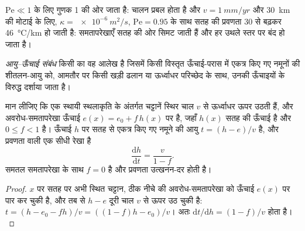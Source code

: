 $\mathrm{Pe} \ll 1$ के लिए गुणक 1 की ओर जाता है: चालन प्रबल होता है और
$v = \qty{1}{mm/yr}$ और \qty{30}{km} की मोटाई के लिए,
$\kappa = \qty{e-6}{m^2/s}$, $\mathrm{Pe} = 0.95$ के साथ सतह की प्रवणता
30 से बढ़कर \qty{46}{\celsius/km} हो जाती है: समतापरेखाएँ सतह की ओर
सिमट जाती हैं और हर  उथले स्तर पर बंद हो जाता है।

\begin{definition}[आयु--ऊँचाई संबंध]\label{def:b3:orogenic-wedges:age-elevation}
\emph{आयु--ऊँचाई संबंध} किसी  का
वह आलेख है जिसमें किसी विस्तृत ऊँचाई-परास में एकत्र किए गए
नमूनों की शीतलन-आयु को, आमतौर पर किसी खड़ी ढलान या ऊर्ध्वाधर परिच्छेद के साथ,
उनकी ऊँचाइयों के विरुद्ध दर्शाया जाता है।
\end{definition}

\begin{proposition}[आयु--ऊँचाई संबंध की प्रवणता]\label{prop:b3:orogenic-wedges:age-elevation}
मान लीजिए कि एक स्थायी स्थलाकृति के अंतर्गत चट्टानें स्थिर चाल $v$ से ऊर्ध्वाधर ऊपर उठती हैं, और
अवरोध-समतापरेखा ऊँचाई $e(x) = e_0 +
f\,h(x)$ पर है, जहाँ $h(x)$ सतह की ऊँचाई है और $0 \le f < 1$ है। ऊँचाई $h$ पर सतह से
एकत्र किए गए नमूने की आयु $t = (h - e)/v$ है,
और  प्रवणता वाली एक सीधी रेखा है
\[
  \frac{\mathrm dh}{\mathrm dt} = \frac{v}{1 - f}.
\]
समतल समतापरेखा के साथ $f = 0$ है और प्रवणता उत्खनन-दर होती है।
\end{proposition}

\begin{proof}
$x$ पर सतह पर अभी स्थित चट्टान, ठीक नीचे की अवरोध-समतापरेखा को
ऊँचाई $e(x)$ पर पार कर चुकी है, और तब से $h - e$ दूरी चाल $v$ से ऊपर उठ चुकी है:
$t = (h - e_0 - fh)/v = ((1 - f)h - e_0)/v$। अतः $\mathrm dt/\mathrm dh =
(1 - f)/v$ होता है।
\end{proof}


